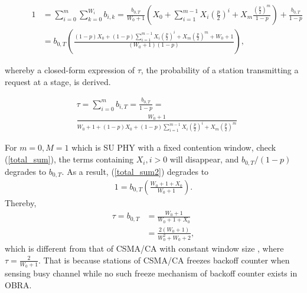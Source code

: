 \documentclass[journal]{IEEEtran}
\newcounter{MYtempeqncnt}
\begin{document}
\begin{figure}[!t]
\begin{align}
1 &= \sum_{i=0}^m \sum_{k=0}^{W_i}b_{i,k} 
 = \frac{b_{0,T}}{W_0+1}\left( X_0 + \sum_{i=1}^{m-1}X_i\left( \frac{p}{2}\right)^i + X_m\frac{\left( \frac{p}{2}\right)^m}{1-p}\right) + \frac{b_{0,T}}{1-p}\label{total_sum}\\
& = b_{0,T}\left( \frac{(1-p)X_0+(1-p) \sum_{i=1}^{m-1}X_i\left( \frac{p}{2}\right)^i+X_m\left( \frac{p}{2}\right)^m+W_0+1}{(W_0+1)(1-p)}\right), \label{total_sum2}
\end{align}
\hrulefill
\end{figure}

whereby a closed-form expression of $\tau$, the probability of a station transmitting a request at a stage, is derived.

\begin{align}
\label{tau_general}
&\tau = \sum_{i=0}^m b_{i,T} = \frac{b_{0,T}}{1-p} = \nonumber \\
&\frac{W_0+1}{W_0+1+(1-p)X_0+(1-p) \sum_{i=1}^{m-1}X_i\left( \frac{p}{2}\right)^i+X_m\left( \frac{p}{2}\right)^m}
\end{align}

For $m=0, M=1$ which is SU PHY with a fixed contention window, check (\ref{total_sum}), the terms containing $X_i, i>0$ will disappear, and $b_{0,T}/(1-p)$ degrades to $b_{0,T}$.
As a result, (\ref{total_sum2}) degrades to 
\begin{align}
1 = b_{0,T}\left( \frac{W_0+1+X_0}{W_0+1}\right).
\end{align}
Thereby, 
\begin{align}
\tau = b_{0,T} &= \frac{W_0+1}{W_0+1+X_0} \nonumber\\
				&= \frac{2(W_0+1)}{W_0^2+W_0+2},
\label{tau_W0}
\end{align}
which is different from that of CSMA/CA with constant window size \cite{ho1996performance}, where $\tau=\frac{2}{W_0+1}$.
That is because stations of CSMA/CA freezes backoff counter when sensing busy channel while no such freeze mechanism of backoff counter exists in OBRA. 
\end{document}
